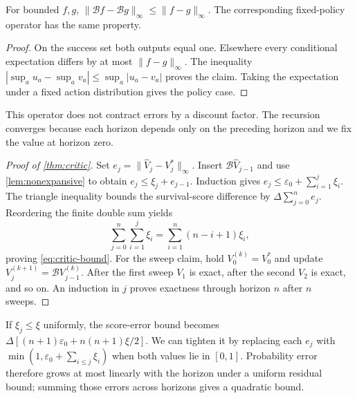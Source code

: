 \documentclass{article} %
\theoremstyle{definition}
\theoremstyle{remark}
\begin{document}
\begin{lemma}[Nonexpansiveness]
\label{lem:nonexpansive}
For bounded $f,g$,
$\|\mathcal Bf-\mathcal Bg\|_\infty\le\|f-g\|_\infty$.
The corresponding fixed-policy operator has the same property.
\end{lemma}
\begin{proof}
On the success set both outputs equal one. Elsewhere every conditional expectation
differs by at most $\|f-g\|_\infty$. The inequality
$|\sup_a u_a-\sup_a v_a|\le\sup_a|u_a-v_a|$ proves the claim.
Taking the expectation under a fixed action distribution gives the policy case.
\end{proof}
This operator does not contract errors by a discount factor. The recursion converges
because each horizon depends only on the preceding horizon and we fix the value at horizon zero.

\begin{proof}[Proof of \cref{thm:critic}]
Set $e_j=\|\hat V_j-V_j^*\|_\infty$. Insert $\mathcal B\hat V_{j-1}$ and use
\cref{lem:nonexpansive} to obtain
$e_j\le\xi_j+e_{j-1}$. Induction gives
$e_j\le\varepsilon_0+\sum_{i=1}^j\xi_i$.
The triangle inequality bounds the survival-score difference by $\Delta\sum_{j=0}^{n}e_j$.
Reordering the finite double sum yields
\[
 \sum_{j=0}^{n}\sum_{i=1}^{j}\xi_i
   =\sum_{i=1}^{n}(n-i+1)\xi_i ,
\]
proving \cref{eq:critic-bound}.
For the sweep claim, hold $V_0^{(k)}=V_0^*$ and update
$V_j^{(k+1)}=\mathcal BV_{j-1}^{(k)}$.
After the first sweep $V_1$ is exact, after the second $V_2$ is exact, and so on.
An induction in $j$ proves exactness through horizon $n$ after $n$ sweeps.
\end{proof}
If $\xi_j\le\xi$ uniformly, the score-error bound becomes
$\Delta[(n+1)\varepsilon_0+n(n+1)\xi/2]$.
We can tighten it by replacing each $e_j$ with
$\min(1,\varepsilon_0+\sum_{i\le j}\xi_i)$ when both values lie in $[0,1]$.
Probability error therefore grows at most linearly with the horizon under a uniform
residual bound; summing those errors across horizons gives a quadratic bound.
\end{document}
